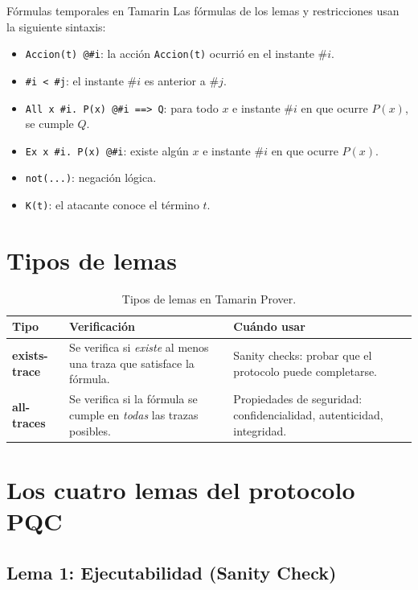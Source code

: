 \documentclass[12pt, a4paper, twoside, openright]{book}
\begin{document}
\begin{cajaDef}{F\'ormulas temporales en Tamarin}
  Las f\'ormulas de los lemas y restricciones usan la siguiente sintaxis:
  \begin{itemize}[itemsep=4pt]
    \item \texttt{Accion(t) @\#i}: la acci\'on \texttt{Accion(t)}
      ocurri\'o en el instante $\#i$.
    \item \texttt{\#i < \#j}: el instante $\#i$ es anterior a $\#j$.
    \item \texttt{All x \#i. P(x) @\#i ==> Q}: para todo $x$ e
      instante $\#i$ en que ocurre $P(x)$, se cumple $Q$.
    \item \texttt{Ex x \#i. P(x) @\#i}: existe alg\'un $x$ e
      instante $\#i$ en que ocurre $P(x)$.
    \item \texttt{not(...)}: negaci\'on l\'ogica.
    \item \texttt{K(t)}: el atacante conoce el t\'ermino $t$.
  \end{itemize}
\end{cajaDef}

\section{Tipos de lemas}

\begin{table}[H]
\centering
\caption{Tipos de lemas en Tamarin Prover.}
\label{tab:tipos-lemas}
\begin{tabularx}{\textwidth}{>{\bfseries\ttfamily}p{3.5cm} X X}
\toprule
\normalfont Tipo & Verificaci\'on & Cu\'ando usar \\
\midrule
exists-trace & Se verifica si \emph{existe} al menos una traza que
  satisface la f\'ormula. & Sanity checks: probar que el protocolo
  puede completarse. \\[6pt]
all-traces & Se verifica si la f\'ormula se cumple en \emph{todas}
  las trazas posibles. & Propiedades de seguridad: confidencialidad,
  autenticidad, integridad. \\
\bottomrule
\end{tabularx}
\end{table}

\section{Los cuatro lemas del protocolo PQC}

\subsection{Lema 1: Ejecutabilidad (Sanity Check)}
\end{document}
